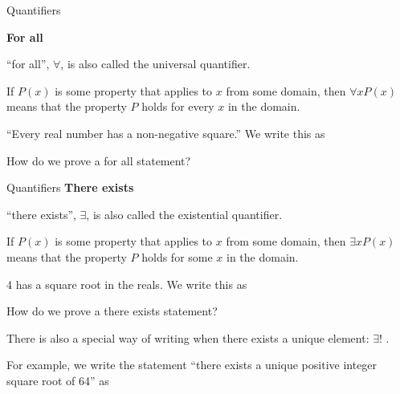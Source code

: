 \documentclass [aspectratio=169]{beamer}
\begin{document}
\begin{frame}{Quantifiers}


\textbf{For all}

\vspace{1em}

``for all'', $\forall$, is also called the universal quantifier.  

\vspace{1em}

If $P(x)$ is some property that applies to $x$ from some domain, then $\forall x P(x)$ means that the property $P$ holds for every $x$ in the domain. 

\vspace{1em}


``Every real number has a non-negative square.'' We write this as 

\vspace{2em}

How do we prove a for all statement? 
\end{frame}

\begin{frame}{Quantifiers}
\textbf{There exists}

``there exists'', $\exists$, is also called the existential quantifier. 


If $P(x)$ is some property that applies to $x$ from some domain, then $\exists x P(x)$ means that the property $P$ holds for some $x$ in the domain. 

\vspace{1em}

4 has a square root in the reals. We write this as

\vspace{2em}

How do we prove a there exists statement?

\vspace{2em}

There is also a special way of writing when there exists a unique element: $\exists!$ .

For example, we write the statement ``there exists a unique positive integer square root of 64'' as

\vspace{2em}
\end{frame}
\end{document}
